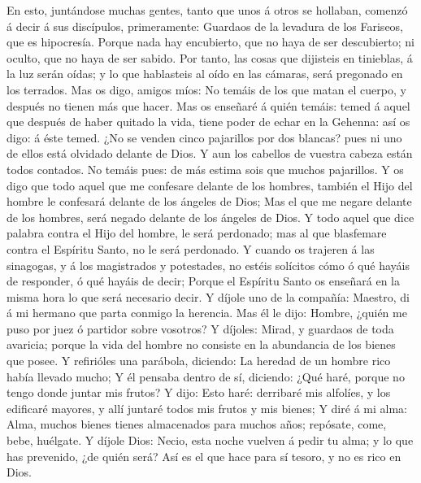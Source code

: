  En esto, juntándose muchas gentes, tanto que unos á otros
se hollaban, comenzó á decir á sus discípulos, primeramente: Guardaos de
la levadura de los Fariseos, que es hipocresía.  Porque
nada hay encubierto, que no haya de ser descubierto; ni oculto, que no
haya de ser sabido.  Por tanto, las cosas que dijisteis en
tinieblas, á la luz serán oídas; y lo que hablasteis al oído en las
cámaras, será pregonado en los terrados.  Mas os digo,
amigos míos: No temáis de los que matan el cuerpo, y después no tienen
más que hacer.  Mas os enseñaré á quién temáis: temed á
aquel que después de haber quitado la vida, tiene poder de echar en la
Gehenna: así os digo: á éste temed.  ¿No se venden cinco
pajarillos por dos blancas? pues ni uno de ellos está olvidado delante
de Dios.  Y aun los cabellos de vuestra cabeza están todos
contados. No temáis pues: de más estima sois que muchos pajarillos.
 Y os digo que todo aquel que me confesare delante de los
hombres, también el Hijo del hombre le confesará delante de los ángeles
de Dios;  Mas el que me negare delante de los hombres,
será negado delante de los ángeles de Dios.  Y todo aquel
que dice palabra contra el Hijo del hombre, le será perdonado; mas al
que blasfemare contra el Espíritu Santo, no le será perdonado.
 Y cuando os trajeren á las sinagogas, y á los
magistrados y potestades, no estéis solícitos cómo ó qué hayáis de
responder, ó qué hayáis de decir;  Porque el Espíritu
Santo os enseñará en la misma hora lo que será necesario decir.
 Y díjole uno de la compañía: Maestro, di á mi hermano
que parta conmigo la herencia.  Mas él le dijo: Hombre,
¿quién me puso por juez ó partidor sobre vosotros?  Y
díjoles: Mirad, y guardaos de toda avaricia; porque la vida del hombre
no consiste en la abundancia de los bienes que posee.  Y
refirióles una parábola, diciendo: La heredad de un hombre rico había
llevado mucho;  Y él pensaba dentro de sí, diciendo: ¿Qué
haré, porque no tengo donde juntar mis frutos?  Y dijo:
Esto haré: derribaré mis alfolíes, y los edificaré mayores, y allí
juntaré todos mis frutos y mis bienes;  Y diré á mi alma:
Alma, muchos bienes tienes almacenados para muchos años; repósate, come,
bebe, huélgate.  Y díjole Dios: Necio, esta noche vuelven
á pedir tu alma; y lo que has prevenido, ¿de quién será? 
Así es el que hace para sí tesoro, y no es rico en Dios. 
